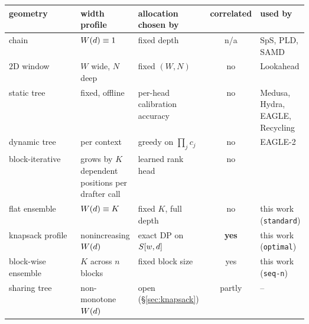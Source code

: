 {\setlength{\tabcolsep}{3pt}\footnotesize
\begin{tabular}{@{}l p{0.19\linewidth} p{0.24\linewidth} c p{0.16\linewidth}@{}}
\toprule
geometry & width profile & allocation chosen by & correlated & used by \\
\midrule
chain & $W(d) \equiv 1$ & fixed depth & n/a & SpS, PLD, SAMD \\
$2$D window & $W$ wide, $N$ deep & fixed $(W, N)$ & no & Lookahead \\
static tree & fixed, offline & per-head calibration accuracy & no & Medusa, Hydra, EAGLE, Recycling \\
dynamic tree & per context & greedy on $\prod_j c_j$ & no & EAGLE-2 \\
block-iterative & grows by $K$ dependent positions per drafter call & learned rank head & no & \citet{shi2026specblock} \\
flat ensemble & $W(d) \equiv K$ & fixed $K$, full depth & no & this work (\texttt{standard}) \\
knapsack profile & nonincreasing $W(d)$ & exact DP on $S[w,d]$ & \textbf{yes} & this work (\texttt{optimal}) \\
block-wise ensemble & $K$ across $n$ blocks & fixed block size & yes & this work (\texttt{seq-n}) \\
sharing tree & non-monotone $W(d)$ & open (\S\ref{sec:knapsack}) & partly & -- \\
\bottomrule
\end{tabular}}
